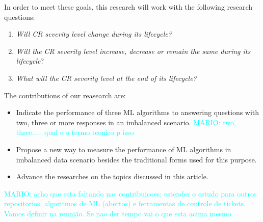 \documentclass[10pt, conference]{IEEEtran}
\newcommand{\mario}[1]{\noindent\textcolor{cyan}{MARIO: {#1}}}
\newcommand{\mario}[1]{}
\begin{document}
In order to meet these goals, this research will work with the following research questions:

\begin{enumerate}[$RQ_1:$]
  \item \textit{Will CR severity level change during its lifecycle?}
  \item \textit{Will the CR severity level increase, decrease or remain the same during its lifecycle}? 
  \item \textit{What will the CR severity level at the end of its lifecycle?} 
\end{enumerate}





The contributions of our reasearch are:


\begin{itemize}
  \item Indicate the performance of three ML algorithms to answering questions with two, three or more responses in an imbalanced scenario.  \mario{two, three..... qual e o termo tecnico p isso}
  \item Propose a new way to measure the performance of ML algorithms in imbalanced data scenario besides the traditional forms used for this purpose.
  \item Advance the researches on the topics discussed in this article.
\end{itemize}

\mario{acho que esta faltando nas contribuicoes: estender o estudo para outros repositorios, algoritmos de ML (abertos) e ferramentas de controle de tickets. Vamos definir na reunião. Se nao der tempo vai o que esta acima mesmo.}
\end{document}
